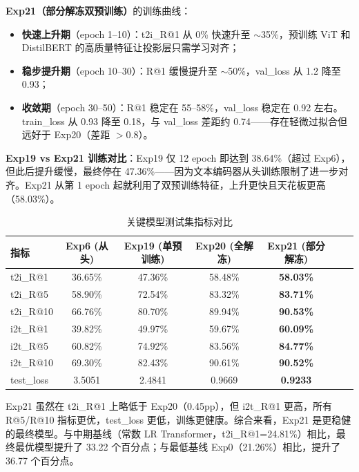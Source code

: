 \documentclass[12pt,a4paper]{article}
\begin{document}
\textbf{Exp21（部分解冻双预训练）}的训练曲线：

\begin{itemize}[nosep]
    \item \textbf{快速上升期}（epoch 1--10）：t2i\_R@1 从 0\% 快速升至 $\sim$35\%，预训练 ViT 和 DistilBERT 的高质量特征让投影层只需学习对齐；
    \item \textbf{稳步提升期}（epoch 10--30）：R@1 缓慢提升至 $\sim$50\%，val\_loss 从 1.2 降至 0.93；
    \item \textbf{收敛期}（epoch 30--50）：R@1 稳定在 55--58\%，val\_loss 稳定在 0.92 左右。train\_loss 从 0.93 降至 0.18，与 val\_loss 差距约 0.74——存在轻微过拟合但远好于 Exp20（差距 $>$0.8）。
\end{itemize}

\textbf{Exp19 vs Exp21 训练对比}：Exp19 仅 12 epoch 即达到 38.64\%（超过 Exp6），但此后提升缓慢，最终停在 47.36\%——因为文本编码器从头训练限制了进一步对齐。Exp21 从第 1 epoch 起就利用了双预训练特征，上升更快且天花板更高（58.03\%）。

\begin{table}[H]
\centering
\caption{关键模型测试集指标对比}
\begin{tabular}{lcccccc}
\toprule
\textbf{指标} & \textbf{Exp6 (从头)} & \textbf{Exp19 (单预训练)} & \textbf{Exp20 (全解冻)} & \textbf{Exp21 (部分解冻)} \\
\midrule
t2i\_R@1 & 36.65\% & 47.36\% & 58.48\% & \textbf{58.03\%} \\
t2i\_R@5 & 58.90\% & 72.54\% & 83.32\% & \textbf{83.71\%} \\
t2i\_R@10 & 66.76\% & 80.70\% & 89.94\% & \textbf{90.53\%} \\
i2t\_R@1 & 39.82\% & 49.97\% & 59.67\% & \textbf{60.09\%} \\
i2t\_R@5 & 60.82\% & 74.92\% & 83.56\% & \textbf{84.77\%} \\
i2t\_R@10 & 69.30\% & 82.43\% & 90.61\% & \textbf{90.52\%} \\
test\_loss & 3.5051 & 2.4841 & 0.9669 & \textbf{0.9233} \\
\bottomrule
\end{tabular}
\end{table}

Exp21 虽然在 t2i\_R@1 上略低于 Exp20（0.45pp），但 i2t\_R@1 更高，所有 R@5/R@10 指标更优，test\_loss 更低，训练更健康。综合来看，Exp21 是更稳健的最终模型。与中期基线（常数 LR Transformer，t2i\_R@1=24.81\%）相比，最终最优模型提升了 33.22 个百分点；与最低基线 Exp0（21.26\%）相比，提升了 36.77 个百分点。
\end{document}
